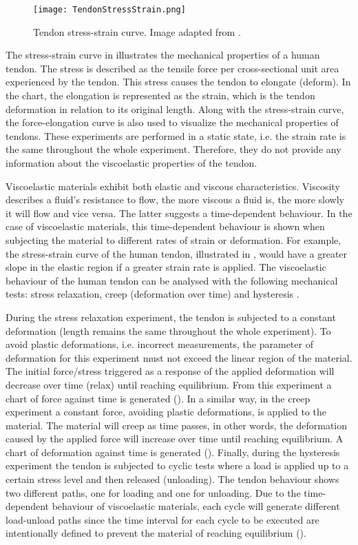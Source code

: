 \begin{figure}[htb!]
	\centering
	\texttt{[image: TendonStressStrain.png]}
	\caption{Tendon stress-strain curve. Image adapted from \cite{maurel1998biomechanical}. }
	\label{fig:tendonSS}
\end{figure}

The stress-strain curve in  illustrates the mechanical properties of a human tendon. The stress is described as the tensile force per cross-sectional unit area experienced by the tendon. This stress causes the tendon to elongate (deform). In the chart, the elongation is represented as the strain, which is the tendon deformation in relation to its original length. Along with the stress-strain curve, the force-elongation curve is also used to visualize the mechanical properties of tendons. These experiments are performed in a static state, i.e. the strain rate is the same throughout the whole experiment. Therefore, they do not provide any information about the viscoelastic properties of the tendon.

Viscoelastic materials exhibit both elastic and viscous characteristics. Viscosity describes a fluid's resistance to flow, the more viscous a fluid is, the more slowly it will flow and vice versa. The latter suggests a time-dependent behaviour. In the case of viscoelastic materials, this time-dependent behaviour is shown when subjecting the material to different rates of strain or deformation. For example, the stress-strain curve of the human tendon, illustrated in , would have a greater slope in the elastic region if a greater strain rate is applied. The viscoelastic behaviour of the human tendon can be analysed with the following mechanical tests: stress relaxation, creep (deformation over time) and hysteresis \cite{nordin2001basic}.

During the stress relaxation experiment, the tendon is subjected to a constant deformation (length remains the same throughout the whole experiment). To avoid plastic deformations, i.e. incorrect measurements, the parameter of deformation for this experiment must not exceed the linear region of the material. The initial force/stress triggered as a response of the applied deformation will decrease over time (relax) until reaching equilibrium. From this experiment a chart of force against time is generated (). In a similar way, in the creep experiment a constant force, avoiding plastic deformations, is applied to the material. The material will creep as time passes, in other words, the deformation caused by the applied force will increase over time until reaching equilibrium. A chart of deformation against time is generated (). Finally, during the hysteresis experiment the tendon is subjected to cyclic tests where a load is applied up to a certain stress level and then released (unloading). The tendon behaviour shows two different paths, one for loading and one for unloading. Due to the time-dependent behaviour of viscoelastic materials, each cycle will generate different load-unload paths since the time interval for each cycle to be executed are intentionally defined to prevent the material of reaching equilibrium ().

